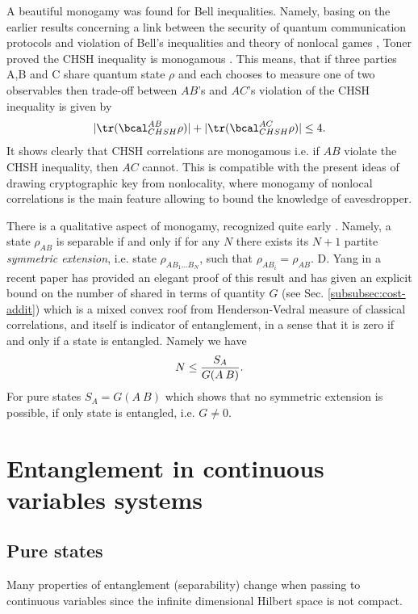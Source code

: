 \documentclass[rmp,12pt,preprint]{revtex4-2}
\begin{document}
A beautiful monogamy was found for Bell inequalities. Namely, basing
on the earlier results concerning a link between the security of
quantum communication protocols and violation of Bell's inequalities
\cite {Scarani1} and theory of nonlocal games \cite{Cleve}, Toner
proved the CHSH inequality is monogamous \cite {Toner}. This means,
that if three parties A,B and C share quantum state $\rho$ and each
chooses to measure one of two observables then trade-off between
$AB$'s and $AC$'s violation of the CHSH inequality is given by
\begin{equation}
|{\tr}(\bcal^{AB}_{CHSH}\rho)|+ |{\tr}(\bcal^{AC}_{CHSH}\rho)|\leq 4.
\label{trad}
\end{equation}
It shows clearly that CHSH correlations are monogamous i.e. if $AB$
violate the CHSH inequality, then $AC$ cannot. This is compatible with
the present ideas of drawing cryptographic key from nonlocality, where
monogamy of nonlocal correlations is the main feature allowing to
bound the knowledge of eavesdropper.

There is a qualitative aspect of monogamy, recognized quite early
\cite{Werner1989-sym-ext,DohertyPS04}. Namely, a state $\rho_{AB}$ is
separable if and only if for any $N$ there exists its $N+1$ partite
{\it symmetric extension}, i.e. state $\rho_{A B_1\ldots B_N}$, such
that $\rho_{AB_i}=\rho_{AB}$. D. Yang in a recent paper
\cite{Yang2006-sym-ext} has provided an elegant proof of this result
and has given an explicit bound on the number of shared in terms of
quantity $G$ (see Sec.  \ref{subsubsec:cost-addit}) which is a mixed
convex roof from Henderson-Vedral measure of classical correlations,
and itself is indicator of entanglement, in a sense that it is zero if
and only if a state is entangled. Namely we have
\begin{equation}
N\leq {S_A\over G(A\>B)}.
\end{equation}
For pure states $S_A=G(A\>B)$ which shows that no symmetric extension
is possible, if only state is entangled, i.e.  $G\not=0$.



\section{Entanglement in continuous variables systems}
\subsection{Pure states}

Many properties of entanglement (separability) change when passing to
continuous variables since the infinite dimensional Hilbert space is
not compact.
\end{document}
